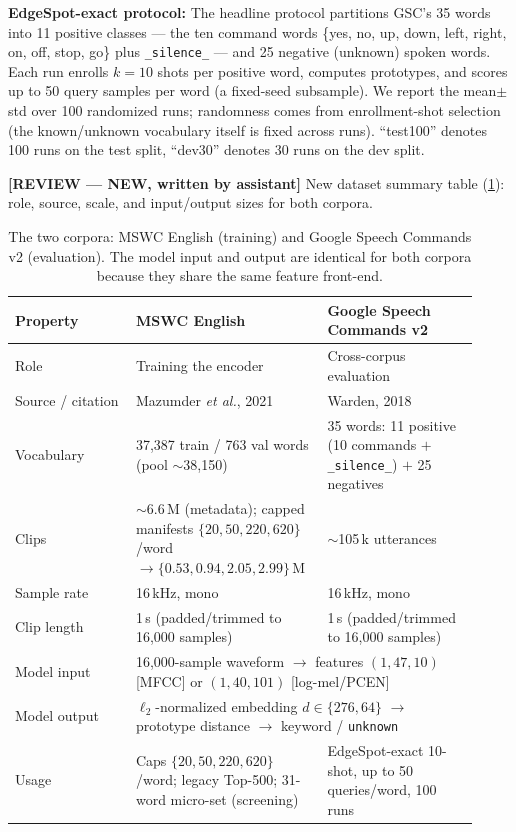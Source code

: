 \documentclass[12pt,a4paper]{report}
\newcommand{\reviewnote}[1]{%
    \par\smallskip\noindent
    \colorbox{yellow!35}{\parbox{0.97\linewidth}{\small\textbf{[REVIEW — NEW, written by assistant]}\; #1}}%
    \par\smallskip}
\newcommand{\reviewnote}[1]{}
\newcommand{\code}[1]{\texttt{\small #1}}
\begin{document}
\textbf{EdgeSpot-exact protocol:} The headline protocol partitions GSC's 35 words
into 11 positive classes --- the ten command words \{yes, no, up, down, left,
right, on, off, stop, go\} plus \code{\_silence\_} --- and 25 negative (unknown)
spoken words. Each run enrolls $k{=}10$ shots per positive word, computes
prototypes, and scores up to 50 query samples per word (a fixed-seed subsample).
We report the mean$\pm$std over 100 randomized runs; randomness comes from
enrollment-shot selection (the known/unknown vocabulary itself is fixed across
runs). ``test100'' denotes 100 runs on the test split, ``dev30'' denotes 30 runs
on the dev split.

\reviewnote{New dataset summary table (\ref{tab:datasets}): role, source, scale,
and input/output sizes for both corpora.}

\begin{table}[H]
\centering
\caption{The two corpora: MSWC English (training) and Google Speech Commands v2
(evaluation). The model input and output are identical for both corpora because
they share the same feature front-end.}
\label{tab:datasets}
\small
\setlength{\tabcolsep}{4pt}
\begin{tabular}{p{0.24\linewidth} p{0.38\linewidth} p{0.30\linewidth}}
\toprule
\textbf{Property} & \textbf{MSWC English} & \textbf{Google Speech Commands v2}\\
\midrule
Role           & Training the encoder & Cross-corpus evaluation \\
Source / citation & Mazumder \emph{et al.}, 2021~\cite{mazumder2021mswc} &
                 Warden, 2018~\cite{warden2018speech} \\
Vocabulary     & 37,387 train / 763 val words (pool $\sim$38,150) &
                 35 words: 11 positive (10 commands $+$ \code{\_silence\_}) $+$ 25 negatives \\
Clips          & $\sim$6.6\,M (metadata); capped manifests $\{20,50,220,620\}$/word
                 $\to \{0.53, 0.94, 2.05, 2.99\}$\,M &
                 $\sim$105\,k utterances \\
Sample rate    & 16\,kHz, mono & 16\,kHz, mono \\
Clip length    & 1\,s (padded/trimmed to 16,000 samples) & 1\,s (padded/trimmed to 16,000 samples) \\
Model input    & \multicolumn{2}{p{0.70\linewidth}}{16,000-sample waveform
                 $\to$ features $(1,47,10)$ [MFCC] or $(1,40,101)$ [log-mel/PCEN]} \\
Model output   & \multicolumn{2}{p{0.70\linewidth}}{$\ell_2$-normalized embedding
                 $d\in\{276,64\}$ $\to$ prototype distance $\to$ keyword /
                 \texttt{unknown}} \\
Usage          & Caps $\{20,50,220,620\}$/word; legacy Top-500; 31-word micro-set
                 (screening) & EdgeSpot-exact 10-shot, up to 50 queries/word,
                 100 runs \\
\bottomrule
\end{tabular}
\end{table}
\end{document}
